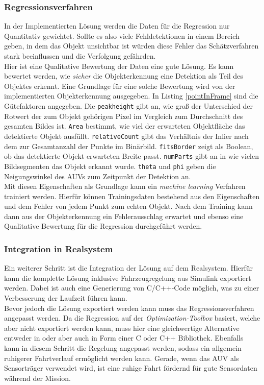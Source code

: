 \subsubsection{Regressionsverfahren}
\label{sec_learnWeights}
In der Implementierten Lösung werden die Daten für die Regression nur Quantitativ gewichtet. Sollte es also viele Fehldetektionen in einem Bereich geben, in dem das Objekt unsichtbar ist würden diese Fehler das Schätzverfahren stark beeinflussen und die Verfolgung gefährden.\\
Hier ist eine Qualitative Bewertung der Daten eine gute Lösung. Es kann bewertet werden, wie \textit{sicher} die Objekterkennung eine Detektion als Teil des Objektes erkennt. Eine Grundlage für eine solche Bewertung wird von der implementierten Objekterkennung ausgegeben. In Listing \ref{pointInFrame} sind die Gütefaktoren angegeben. Die \texttt{peakheight} gibt an, wie groß der Unterschied der Rotwert der zum Objekt gehörigen Pixel im Vergleich zum Durchschnitt des gesamten Bildes ist. \texttt{Area} bestimmt, wie viel der erwarteten Objektfläche das detektierte Objekt ausfüllt. \texttt{relativeCount} gibt das Verhältnis der Inlier nach dem \rans zur Gesamtanzahl der Punkte im Binärbild. \texttt{fitsBorder} zeigt als Boolean, ob das detektierte Objekt erwarteten Breite passt. \texttt{numParts} gibt an in wie vielen Bildsegmenten das Objekt erkannt wurde. \texttt{theta} und \texttt{phi} geben die Neigungswinkel des AUVs zum Zeitpunkt der Detektion an.\\
Mit diesen Eigenschaften als Grundlage kann ein \textit{machine learning} Verfahren trainiert werden. Hierfür können Trainingsdaten bestehend aus den Eigenschaften und dem Fehler von jedem Punkt zum echten Objekt. Nach dem Training kann dann aus der Objekterkennung ein Fehlerausschlag erwartet und ebenso eine Qualitative Bewertung für die Regression durchgeführt werden.

\subsubsection{Integration in Realsystem}
Ein weiterer Schritt ist die Integration der Lösung auf dem Realsystem. Hierfür kann die komplette Lösung inklusive Fahrzeugregelung aus Simulink exportiert werden. Dabei ist auch eine Generierung von C/C++-Code möglich, was zu einer Verbesserung der Laufzeit führen kann.\\
Bevor jedoch die Lösung exportiert werden kann muss das Regressionsverfahren angepasst werden. Da die Regression auf der \textit{Optimization-Toolbox} basiert, welche aber nicht exportiert werden kann, muss hier eine gleichwertige Alternative entweder in \matlab oder aber auch in Form einer C oder C++ Bibliothek.
Ebenfalls kann in diesem Schritt die Regelung angepasst werden, sodass ein allgemein ruhigerer Fahrtverlauf ermöglicht werden kann. Gerade, wenn das AUV als Sensorträger verwendet wird, ist eine ruhige Fahrt fördernd für gute Sensordaten während der Mission.